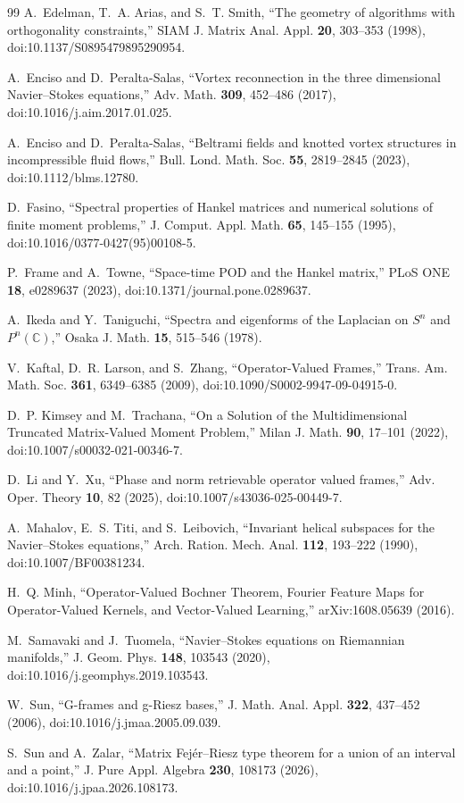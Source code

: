 \documentclass[
 aps,
 prd,
 reprint,
 amsmath,
 amssymb,
 nofootinbib,
 superscriptaddress
]{revtex4-2}
\theoremstyle{definition}
\theoremstyle{remark}
\begin{document}
\begin{thebibliography}{99}
A.~Edelman, T.~A. Arias, and S.~T. Smith,
``The geometry of algorithms with orthogonality constraints,''
SIAM J. Matrix Anal. Appl. \textbf{20}, 303--353 (1998),
doi:10.1137/S0895479895290954.

A.~Enciso and D.~Peralta-Salas,
``Vortex reconnection in the three dimensional Navier--Stokes equations,''
Adv. Math. \textbf{309}, 452--486 (2017),
doi:10.1016/j.aim.2017.01.025.

A.~Enciso and D.~Peralta-Salas,
``Beltrami fields and knotted vortex structures in incompressible fluid
flows,''
Bull. Lond. Math. Soc. \textbf{55}, 2819--2845 (2023),
doi:10.1112/blms.12780.

D.~Fasino,
``Spectral properties of Hankel matrices and numerical solutions of finite
moment problems,''
J. Comput. Appl. Math. \textbf{65}, 145--155 (1995),
doi:10.1016/0377-0427(95)00108-5.

P.~Frame and A.~Towne,
``Space-time POD and the Hankel matrix,''
PLoS ONE \textbf{18}, e0289637 (2023),
doi:10.1371/journal.pone.0289637.

A.~Ikeda and Y.~Taniguchi,
``Spectra and eigenforms of the Laplacian on $S^n$ and $P^n(\mathbb C)$,''
Osaka J. Math. \textbf{15}, 515--546 (1978).

V.~Kaftal, D.~R. Larson, and S.~Zhang,
``Operator-Valued Frames,''
Trans. Am. Math. Soc. \textbf{361}, 6349--6385 (2009),
doi:10.1090/S0002-9947-09-04915-0.

D.~P. Kimsey and M.~Trachana,
``On a Solution of the Multidimensional Truncated Matrix-Valued Moment
Problem,''
Milan J. Math. \textbf{90}, 17--101 (2022),
doi:10.1007/s00032-021-00346-7.

D.~Li and Y.~Xu,
``Phase and norm retrievable operator valued frames,''
Adv. Oper. Theory \textbf{10}, 82 (2025),
doi:10.1007/s43036-025-00449-7.

A.~Mahalov, E.~S. Titi, and S.~Leibovich,
``Invariant helical subspaces for the Navier--Stokes equations,''
Arch. Ration. Mech. Anal. \textbf{112}, 193--222 (1990),
doi:10.1007/BF00381234.

H.~Q. Minh,
``Operator-Valued Bochner Theorem, Fourier Feature Maps for Operator-Valued
Kernels, and Vector-Valued Learning,''
arXiv:1608.05639 (2016).

M.~Samavaki and J.~Tuomela,
``Navier--Stokes equations on Riemannian manifolds,''
J. Geom. Phys. \textbf{148}, 103543 (2020),
doi:10.1016/j.geomphys.2019.103543.

W.~Sun,
``G-frames and g-Riesz bases,''
J. Math. Anal. Appl. \textbf{322}, 437--452 (2006),
doi:10.1016/j.jmaa.2005.09.039.

S.~Sun and A.~Zalar,
``Matrix Fej\'er--Riesz type theorem for a union of an interval and a point,''
J. Pure Appl. Algebra \textbf{230}, 108173 (2026),
doi:10.1016/j.jpaa.2026.108173.

\end{thebibliography}
\end{document}
